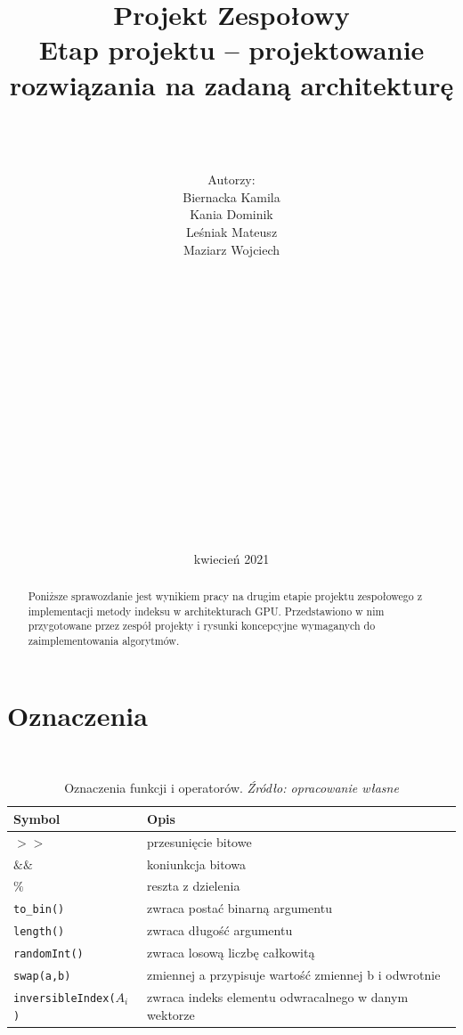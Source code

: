 \documentclass[]{article}
\title{Projekt Zespołowy \\
	\Huge Etap projektu – projektowanie rozwiązania na zadaną architekturę}
\author{\\ \\ \\ Autorzy:
	\\Biernacka Kamila\\ 
	Kania Dominik\\ 
	Leśniak Mateusz\\ 
	Maziarz Wojciech\\ \\ \\ \\ \\ \\ \\ \\ \\ \\ \\ \\ \\ \\ \\ \\ \\  }
\date{kwiecień 2021}
\begin{document}



\maketitle
\newpage



\begin{abstract}
Poniższe sprawozdanie jest wynikiem pracy na drugim etapie projektu zespołowego z implementacji metody indeksu w architekturach GPU. Przedstawiono w nim przygotowane przez zespół projekty i rysunki koncepcyjne wymaganych do zaimplementowania algorytmów.
\end{abstract}

\tableofcontents
\clearpage
\section{Oznaczenia} ~


\begin{longtable}{|p{}|l|}
	\caption{Oznaczenia funkcji i operatorów. \textit{Źródło: opracowanie własne}}
	\label{oznaczenia}
	\\\hline
	\textbf{Symbol}   & 	\textbf{Opis} \\ \hline
	$>>$& przesunięcie bitowe\\ \hline
	$\&\&$     & koniunkcja bitowa\\ \hline
	$\%$  & reszta z dzielenia \\ \hline
	\texttt{to\_bin()}  & zwraca postać binarną argumentu \\ \hline
	\texttt{length()}  & zwraca długość argumentu \\ \hline
	\texttt{randomInt()} & zwraca losową liczbę całkowitą \\ \hline
	\texttt{swap(a,b)} & zmiennej a przypisuje wartość zmiennej b i odwrotnie\\ \hline
	\texttt{inversibleIndex($A_i$)} & zwraca indeks elementu odwracalnego w danym wektorze \\ \hline
	
\end{longtable}
\newpage
\end{document}
